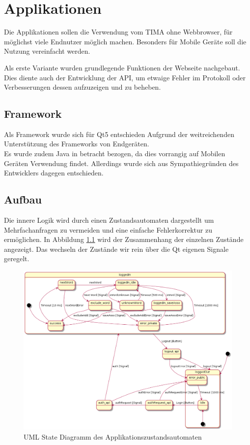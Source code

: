 \chapter{Applikationen}
Die Applikationen sollen die Verwendung vom TIMA ohne Webbrowser, für möglichst
viele Endnutzer möglich machen.  Besonders für Mobile Geräte soll die Nutzung
vereinfacht werden.

Als erste Variante wurden grundlegende Funktionen der
Webseite nachgebaut.  Dies diente auch der Entwicklung der API, um etwaige
Fehler im Protokoll oder Verbesserungen dessen aufzuzeigen und zu beheben.

\section{Framework}
Als Framework wurde sich für Qt5 entschieden Aufgrund der weitreichenden
Unterstützung des Frameworks von Endgeräten.\\ Es wurde zudem Java in betracht
bezogen, da dies vorrangig auf Mobilen Geräten Verwendung findet. Allerdings
wurde sich aus Sympathiegründen des Entwicklers dagegen entschieden.

\section{Aufbau}
Die innere Logik wird durch einen Zustandsautomaten dargestellt um
Mehrfachanfragen zu vermeiden und eine einfache Fehlerkorrektur zu ermöglichen.
In Abbildung \ref{fig:uml_automata} wird der Zusammenhang der einzelnen
Zustände angezeigt. Das wechseln der Zustände wir rein über die Qt eigenen
Signale geregelt.
\begin{figure}[!h]
	\centering
	\includegraphics[width=\textwidth]{../UML/app_automata.png}
	\caption{UML State Diagramm des Applikationszustandsautomaten}
	\label{fig:uml_automata}
\end{figure}

